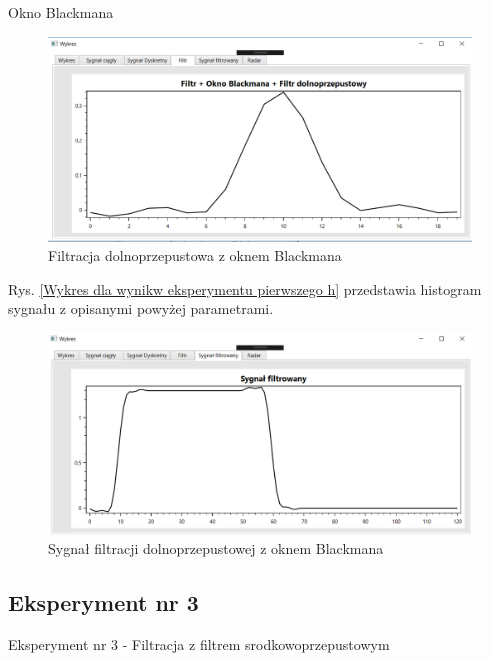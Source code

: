 \documentclass[12pt]{article}
\begin{document}
\newpage
Okno Blackmana
\begin{figure}[h!]
 \centering
 \includegraphics[width=12.3cm]{prostFDOB.PNG}
 \vspace{-0.3cm}
 \caption{Filtracja dolnoprzepustowa z oknem Blackmana}
 \label{Wykres dla wyników eksperymentu drugiego}
\end{figure}
\newpage
Rys. \ref{Wykres dla wynikw eksperymentu pierwszego h} przedstawia histogram sygnału z opisanymi powyżej parametrami. 
\begin{figure}[h!]
 \centering
 \includegraphics[width=12.3cm]{prostSFDB.PNG}
 \vspace{-0.3cm}
 \caption{Sygnał filtracji dolnoprzepustowej z oknem Blackmana}
 \label{Histogram dla wyników eksperymentu drugiego}
\end{figure}


\subsection{Eksperyment nr 3}

Eksperyment nr 3  - Filtracja z filtrem srodkowoprzepustowym
\end{document}
